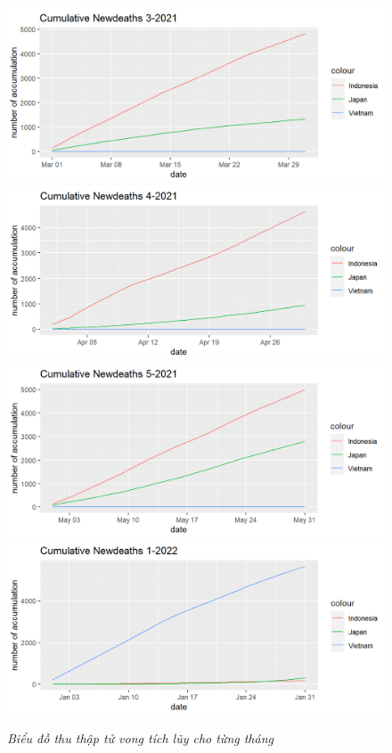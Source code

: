 \documentclass[a4paper]{article}
\theoremstyle{definition}
\begin{document}
\begin{enumerate}[1)]
	\begin{figure}[H]
	    \begin{center}
    		\includegraphics[scale=0.5]{vi/cml_nd_3_2021}
    		\includegraphics[scale=0.5]{vi/cml_nd_4_2021}
    		\includegraphics[scale=0.5]{vi/cml_nd_5_2021}
    		\includegraphics[scale=0.5]{vi/cml_nd_1_2022}
	    \end{center}
	    \vspace{+3mm}\caption{\it Biểu đồ thu thập tử vong tích lũy cho từng tháng}
	\end{figure}
	
\end{enumerate}
\end{document}
